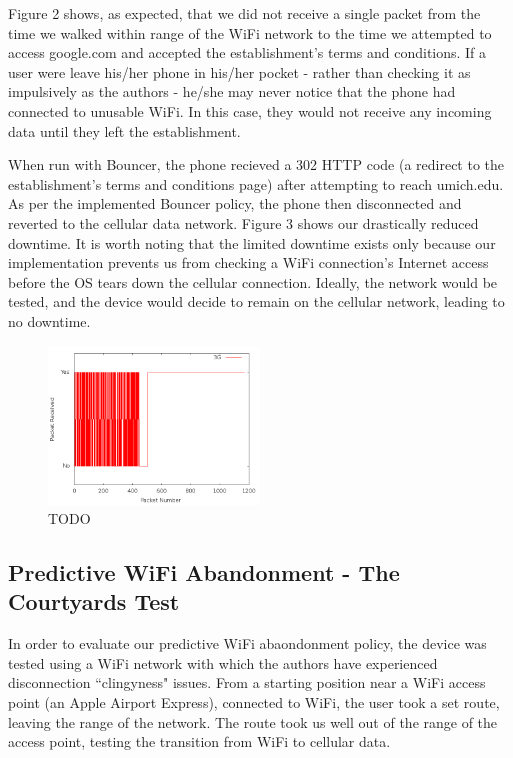 Figure 2 shows, as expected, that we did not receive a single packet from the time we walked within range of the WiFi network to the time we attempted to access google.com and accepted the establishment's terms and conditions. If a user were leave his/her phone in his/her pocket - rather than checking it as impulsively as the authors - he/she may never notice that the phone had connected to unusable WiFi. In this case, they would not receive any incoming data until they left the establishment.

When run with Bouncer, the phone recieved a 302 HTTP code (a redirect to the establishment's terms and conditions page) after attempting to reach umich.edu. As per the implemented Bouncer policy, the phone then disconnected and reverted to the cellular data network. Figure 3 shows our drastically reduced downtime. It is worth noting that the limited downtime exists only because our implementation prevents us from checking a WiFi connection's Internet access before the OS tears down the cellular connection. Ideally, the network would be tested, and the device would decide to remain on the cellular network, leading to no downtime.

\begin{figure}
	\includegraphics[width=0.5\textwidth]{paneraWithPolicy}
	\caption{TODO}
\end{figure}

\subsection{Predictive WiFi Abandonment - The Courtyards Test}
In order to evaluate our predictive WiFi abaondonment policy, the device was tested using a WiFi network with which the authors have experienced disconnection ``clingyness" issues. From a starting position near a WiFi access point (an Apple Airport Express), connected to WiFi, the user took a set route, leaving the range of the network. The route took us well out of the range of the access point, testing the transition from WiFi to cellular data.


